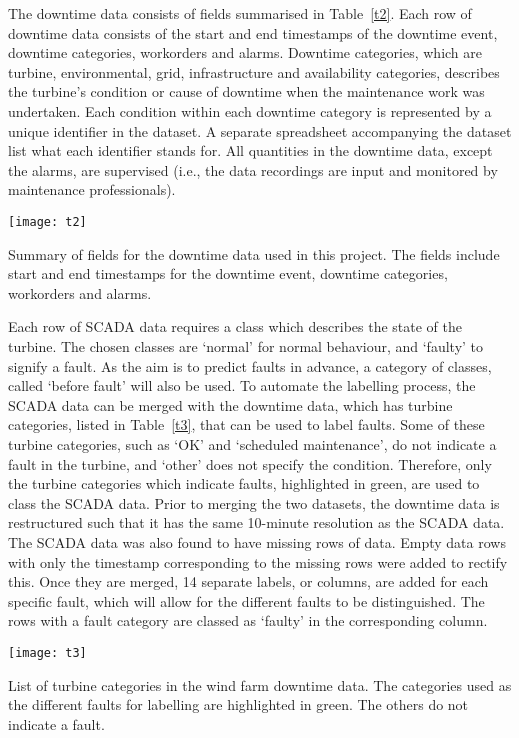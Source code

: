 The downtime data consists of fields summarised in Table~\ref{t2}. Each row of downtime data consists of the start and end timestamps of the downtime event, downtime categories, workorders and alarms. Downtime categories, which are turbine, environmental, grid, infrastructure and availability categories, describes the turbine's condition or cause of downtime when the maintenance work was undertaken. Each condition within each downtime category is represented by a unique identifier in the dataset. A separate spreadsheet accompanying the dataset list what each identifier stands for. All quantities in the downtime data, except the alarms, are supervised (i.e., the data recordings are input and monitored by maintenance professionals).

\begin{table}
    \centering
    \texttt{[image: t2]}
    \caption{\label{t2}Summary of fields for the downtime data used in this project. The fields include start and end timestamps for the downtime event, downtime categories, workorders and alarms.}
\end{table}

Each row of SCADA data requires a class which describes the state of the turbine. The chosen classes are `normal' for normal behaviour, and `faulty' to signify a fault. As the aim is to predict faults in advance, a category of classes, called `before fault' will also be used. To automate the labelling process, the SCADA data can be merged with the downtime data, which has turbine categories, listed in Table~\ref{t3}, that can be used to label faults. Some of these turbine categories, such as `OK' and `scheduled maintenance', do not indicate a fault in the turbine, and `other' does not specify the condition. Therefore, only the turbine categories which indicate faults, highlighted in green, are used to class the SCADA data. Prior to merging the two datasets, the downtime data is restructured such that it has the same 10-minute resolution as the SCADA data. The SCADA data was also found to have missing rows of data. Empty data rows with only the timestamp corresponding to the missing rows were added to rectify this. Once they are merged, 14 separate labels, or columns, are added for each specific fault, which will allow for the different faults to be distinguished. The rows with a fault category are classed as `faulty' in the corresponding column.

\begin{table}
    \centering
    \texttt{[image: t3]}
    \caption{\label{t3}List of turbine categories in the wind farm downtime data. The categories used as the different faults for labelling are highlighted in green. The others do not indicate a fault.}
\end{table}

